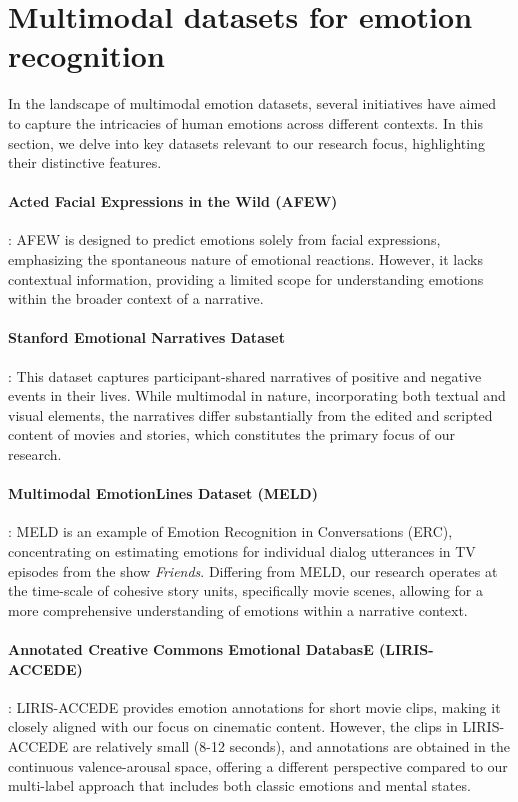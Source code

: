 \section{Multimodal datasets for emotion recognition}
\label{sec:multimodalDatasets}
In the landscape of multimodal emotion datasets, several initiatives have aimed to capture the intricacies of human emotions across different contexts. In this section, we delve into key datasets relevant to our research focus, highlighting their distinctive features.

\paragraph{Acted Facial Expressions in the Wild (AFEW)~\cite{afew}}:
\label{sec:afew}
AFEW is designed to predict emotions solely from facial expressions, emphasizing the spontaneous nature of emotional reactions. However, it lacks contextual information, providing a limited scope for understanding emotions within the broader context of a narrative.

\paragraph{Stanford Emotional Narratives Dataset~\cite{ongSENDv1}}:
\label{sec:sendv1}
This dataset captures participant-shared narratives of positive and negative events in their lives. While multimodal in nature, incorporating both textual and visual elements, the narratives differ substantially from the edited and scripted content of movies and stories, which constitutes the primary focus of our research.

\paragraph{Multimodal EmotionLines Dataset (MELD)~\cite{poria2019meld}}:
\label{sec:meld}
MELD is an example of Emotion Recognition in Conversations (ERC), concentrating on estimating emotions for individual dialog utterances in TV episodes from the show \emph{Friends}. Differing from MELD, our research operates at the time-scale of cohesive story units, specifically movie scenes, allowing for a more comprehensive understanding of emotions within a narrative context.

\paragraph{Annotated Creative Commons Emotional DatabasE (LIRIS-ACCEDE)~\cite{BaveyeLIRIS}}:
\label{sec:lirisaccede}
LIRIS-ACCEDE provides emotion annotations for short movie clips, making it closely aligned with our focus on cinematic content. However, the clips in LIRIS-ACCEDE are relatively small (8-12 seconds), and annotations are obtained in the continuous valence-arousal space, offering a different perspective compared to our multi-label approach that includes both classic emotions and mental states.

